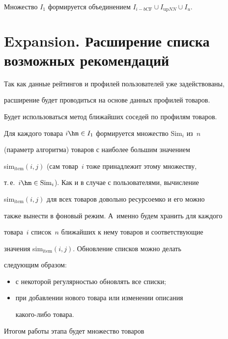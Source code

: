 Множество $I_1$ формируется объединением $I_{i-b\mathrm{CF}} \cup I_{\mathrm{up}NN}


\cup I_{u}.$








\section{Expansion. Расширение списка возможных рекомендаций}





Так как данные рейтингов и профилей пользователей уже задействованы,


расширение будет проводиться на основе данных профилей товаров.


Будет использоваться метод ближайших соседей по профилям товаров.


Для каждого товара $i \hm\in I_1$ формируется множество Sim$_i$ из~$n$


(параметр алгоритма) товаров с наиболее большим значением


sim$_{\mathrm{item}}(i,j)$ (сам товар~$i$ тоже принадлежит этому множеству,


т.\,е.\ $i\hm\in \mathrm{Sim}_i$). Как и в случае с пользователями, вычисление


sim$_{\mathrm{item}}(i,j)$ для всех товаров довольно ресурсоемко и его можно


также вынести в фоновый режим. А~именно будем хранить для каждого


товара~$i$ список~$n$ ближайших к нему товаров и соответствующие


значения sim$_{\mathrm{item}}(i,j).$ Обновление списков можно делать


следующим образом:


\begin{itemize} %


    \item с некоторой регулярностью обновлять все списки;


\item при добавлении нового товара или изменении описания


ка\-ко\-го-ли\-бо товара.


\end{itemize}





Итогом работы этапа будет множество товаров


